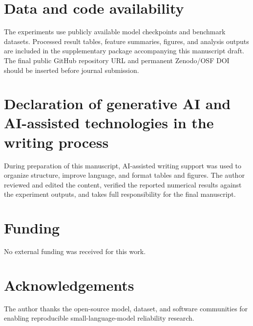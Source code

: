 \documentclass[preprint,12pt,authoryear]{elsarticle}
\begin{document}
\section*{Data and code availability}
The experiments use publicly available model checkpoints and benchmark datasets. Processed result tables, feature summaries, figures, and analysis outputs are included in the supplementary package accompanying this manuscript draft. The final public GitHub repository URL and permanent Zenodo/OSF DOI should be inserted before journal submission.

\section*{Declaration of generative AI and AI-assisted technologies in the writing process}
During preparation of this manuscript, AI-assisted writing support was used to organize structure, improve language, and format tables and figures. The author reviewed and edited the content, verified the reported numerical results against the experiment outputs, and takes full responsibility for the final manuscript.

\section*{Funding}
No external funding was received for this work.

\section*{Acknowledgements}
The author thanks the open-source model, dataset, and software communities for enabling reproducible small-language-model reliability research.
\end{document}
